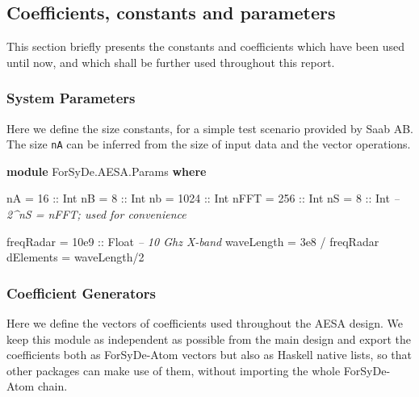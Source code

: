\documentclass[
  a4paper,
]{article}
\newenvironment{Shaded}{}{}
\newcommand{\CommentTok}[1]{\textcolor[rgb]{0.38,0.63,0.69}{\textit{#1}}}
\newcommand{\DataTypeTok}[1]{\textcolor[rgb]{0.56,0.13,0.00}{#1}}
\newcommand{\DecValTok}[1]{\textcolor[rgb]{0.25,0.63,0.44}{#1}}
\newcommand{\FloatTok}[1]{\textcolor[rgb]{0.25,0.63,0.44}{#1}}
\newcommand{\FunctionTok}[1]{\textcolor[rgb]{0.02,0.16,0.49}{#1}}
\newcommand{\KeywordTok}[1]{\textcolor[rgb]{0.00,0.44,0.13}{\textbf{#1}}}
\newcommand{\NormalTok}[1]{#1}
\newcommand{\OtherTok}[1]{\textcolor[rgb]{0.00,0.44,0.13}{#1}}
\begin{document}
\hypertarget{sec:consts-coefs-atom}{%
\subsection{Coefficients, constants and
parameters}\label{sec:consts-coefs-atom}}

This section briefly presents the constants and coefficients which have
been used until now, and which shall be further used throughout this
report.

\hypertarget{sec:aesa-parameters}{%
\subsubsection{System Parameters}\label{sec:aesa-parameters}}

Here we define the size constants, for a simple test scenario provided
by Saab AB. The size \texttt{nA} can be inferred from the size of input
data and the vector operations.

\begin{Shaded}
\begin{Highlighting}[numbers=left,,firstnumber=6,]
\KeywordTok{module} \DataTypeTok{ForSyDe.AESA.Params} \KeywordTok{where}

\NormalTok{nA   }\FunctionTok{=}   \DecValTok{16}\OtherTok{ ::} \DataTypeTok{Int}
\NormalTok{nB   }\FunctionTok{=}    \DecValTok{8}\OtherTok{ ::} \DataTypeTok{Int}
\NormalTok{nb   }\FunctionTok{=} \DecValTok{1024}\OtherTok{ ::} \DataTypeTok{Int}
\NormalTok{nFFT }\FunctionTok{=}  \DecValTok{256}\OtherTok{ ::} \DataTypeTok{Int}
\NormalTok{nS   }\FunctionTok{=}    \DecValTok{8}\OtherTok{ ::} \DataTypeTok{Int} \CommentTok{-- 2^nS = nFFT; used for convenience}

\NormalTok{freqRadar  }\FunctionTok{=} \FloatTok{10e9}\OtherTok{ ::} \DataTypeTok{Float} \CommentTok{-- 10 Ghz X-band}
\NormalTok{waveLength }\FunctionTok{=} \FloatTok{3e8} \FunctionTok{/}\NormalTok{ freqRadar}
\NormalTok{dElements  }\FunctionTok{=}\NormalTok{ waveLength}\FunctionTok{/}\DecValTok{2}
\end{Highlighting}
\end{Shaded}

\hypertarget{sec:coefs-atom}{%
\subsubsection{Coefficient Generators}\label{sec:coefs-atom}}

Here we define the vectors of coefficients used throughout the AESA
design. We keep this module as independent as possible from the main
design and export the coefficients both as ForSyDe-Atom vectors but also
as Haskell native lists, so that other packages can make use of them,
without importing the whole ForSyDe-Atom chain.
\end{document}
